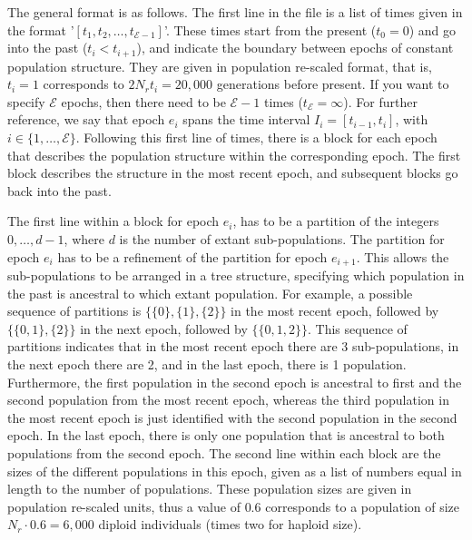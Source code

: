 \documentclass{article}
\numberwithin{equation}{section}
\begin{document}
The general format is as follows. The first line in the file is a list of times given in the format '\texttt{$[ t_1, t_2, \ldots, t_{\mathscr{E}-1} ]$}'. These times start from the present ($t_0=0$) and go into the past ($t_i < t_{i+1}$), and indicate the boundary between epochs of constant population structure. They are given in population re-scaled format, that is, $t_i = 1$ corresponds to $2 N_r t_i = 20,000$ generations before present. If you want to specify $\mathscr{E}$ epochs, then there need to be $\mathscr{E}-1$ times ($t_{\mathscr{E}} = \infty$). For further reference, we say that epoch $e_i$ spans the time interval $I_i = [t_{i-1},t_{i}]$, with $i \in \{1,\ldots,\mathscr{E}\}$. Following this first line of times, there is a block for each epoch that describes the population structure within the corresponding epoch. The first block describes the structure in the most recent epoch, and subsequent blocks go back into the past.

The first line within a block for epoch $e_i$, has to be a partition of the integers $0,\ldots,d-1$, where $d$ is the number of extant sub-populations. The partition for epoch $e_i$ has to be a refinement of the partition for epoch $e_{i+1}$. This allows the sub-populations to be arranged in a tree structure, specifying which population in the past is ancestral to which extant population. For example, a possible sequence of partitions is $\{\{0\},\{1\},\{2\}\}$ in the most recent epoch, followed by $\{\{0,1\},\{2\}\}$ in the next epoch, followed by $\{\{0,1,2\}\}$. This sequence of partitions indicates that in the most recent epoch there are 3 sub-populations, in the next epoch there are 2, and in the last epoch, there is 1 population. Furthermore, the first population in the second epoch is ancestral to first and the second population from the most recent epoch, whereas the third population in the most recent epoch is just identified with the second population in the second epoch. In the last epoch, there is only one population that is ancestral to both populations from the second epoch. The second line within each block are the sizes of the different populations in this epoch, given as a list of numbers equal in length to the number of populations. These population sizes are given in population re-scaled units, thus a value of $0.6$ corresponds to a population of size $N_r \cdot 0.6 = 6,000$ diploid individuals (times two for haploid size).
\end{document}
